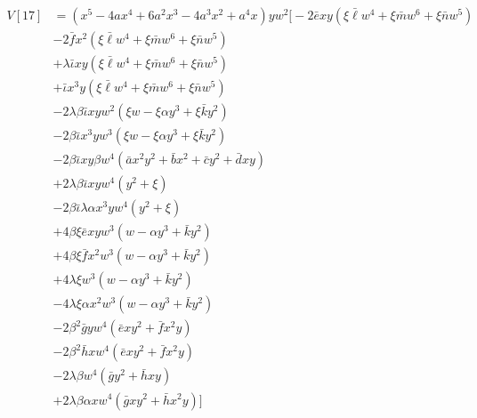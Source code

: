 \documentclass[12pt]{article}
\numberwithin{table}{section}
\begin{document}
\begin{align}
V[17] &= (x^5-4ax^4+6a^2x^3-4a^3x^2+a^4x) yw^2\biggl[-2\bar e x y (\xi\bar \ell w^4 + \xi\bar m w^6 + \xi\bar n w^5)\\
&-2 \bar f x^2 (\xi\bar \ell  w^4 + \xi\bar m  w^6 + \xi\bar n  w^5)\\
&+ \lambda \bar\iota x y(\xi\bar \ell  w^4 + \xi\bar m  w^6 + \xi\bar n  w^5)\\
&+ \bar\iota x^3y(\xi\bar \ell  w^4 + \xi\bar m  w^6 + \xi\bar n  w^5)\\
&-2\lambda\beta \bar \iota x yw^2 ( \xi  w - \xi \alpha y^3  + \xi \bar k y^2 ) \\
&-2\beta \bar \iota x^3y w^3 ( \xi  w - \xi \alpha y^3  + \xi \bar k y^2 ) \\
&- 2\beta \bar \iota x y\beta w^4 (\bar a x^2 y^2 + \bar b x^2 + \bar c y^2 + \bar d xy) \\
&+2\lambda\beta \bar \iota x y  w^4 (y^2  + \xi )\\
&- 2\beta \bar \iota \lambda \alpha x^3 y  w^4 (y^2  + \xi ) \\
& +4\beta\xi \bar e xyw^3(  w - \alpha y^3  + \bar k y^2 ) \\
& +4\beta\xi \bar f x^2 w^3(  w - \alpha y^3  + \bar k y^2 )  \\
&+4\lambda \xi w^3(  w - \alpha y^3  + \bar k y^2 ) \\
&- 4\lambda \xi \alpha 
x^2 w^3(  w - \alpha y^3  + \bar k y^2) \\
&-2\beta^2 \bar g y w^4(\bar e xy^2 + \bar f x^2 y) \\
&-2\beta^2 \bar h x w^4(\bar e xy^2 + \bar f x^2 y) \\
&-2 \lambda \beta w^4 (\bar g y^2 + \bar h x y) \\
&+ 2 \lambda \beta \alpha x w^4 (\bar g xy^2 + \bar h x^2 y)\biggr]
\end{align}
\end{document}
